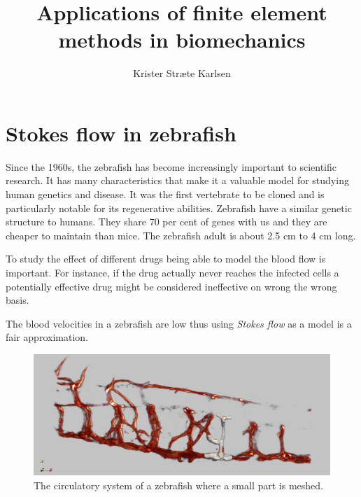\documentclass[epsfig,11pt]{article}
\title{Applications of finite element methods in biomechanics}
\author{Krister Stræte Karlsen}
\begin{document}
\maketitle

\section{Stokes flow in zebrafish}

Since the 1960s, the zebrafish has become increasingly important to scientific research. It has many characteristics that make it a valuable model for studying human genetics and disease. It was the first vertebrate to be cloned and is particularly notable for its regenerative abilities. Zebrafish have a similar genetic structure to humans. They share 70 per cent of genes with us and they are cheaper to maintain than mice. The zebrafish adult is about 2.5 cm to 4 cm long. 

To study the effect of different drugs being able to model the blood flow is important. For instance, if the drug actually never reaches the infected cells a potentially effective drug might be considered ineffective on wrong the wrong basis. 

The blood velocities in a zebrafish are low thus using \emph{Stokes flow} as a model is a fair approximation.

 \begin{figure}[h!] 
\begin{center}
  \includegraphics[scale=0.3]{overview2.png}
  \end{center}
  \caption{The circulatory system of a zebrafish where a small part is meshed.}
\end{figure}
\end{document}
